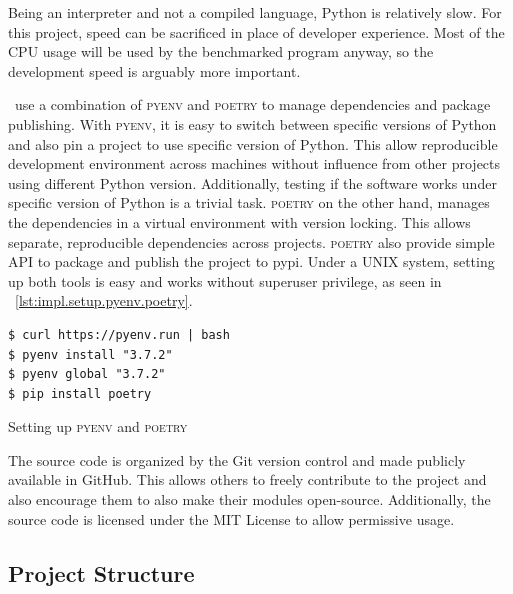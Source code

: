 Being an interpreter and not a compiled language, Python is relatively slow.
For this project, speed can be sacrificed in place of developer experience.
Most of the CPU usage will be used by the benchmarked program anyway, so the development speed is arguably more important.

\First~use a combination of \textsc{pyenv} and \textsc{poetry} to manage dependencies and package publishing.
With \textsc{pyenv}, it is easy to switch between specific versions of Python and also pin a project to use specific version of Python.
This allow reproducible development environment across machines without influence from other projects using different Python version.
Additionally, testing if the software works under specific version of Python is a trivial task.
\textsc{poetry} on the other hand, manages the dependencies in a virtual environment with version locking.
This allows separate, reproducible dependencies across projects.
\textsc{poetry} also provide simple API to package and publish the project to pypi.
Under a UNIX system, setting up both tools is easy and works without superuser privilege, as seen in \lst~\ref{lst:impl.setup.pyenv.poetry}.

\begin{listing}
    \begin{verbatim}
$ curl https://pyenv.run | bash
$ pyenv install "3.7.2"
$ pyenv global "3.7.2"
$ pip install poetry
    \end{verbatim}
    \caption{Setting up \textsc{pyenv} and \textsc{poetry}}
    \label{lst:impl.setup.pyenv.poetry}
\end{listing}

The source code is organized by the Git version control and made publicly available in GitHub.
This allows others to freely contribute to the project and also encourage them to also make their modules open-source.
Additionally, the source code is licensed under the MIT License to allow permissive usage.

\subsection{Project Structure}
\label{sec:impl.structure}

